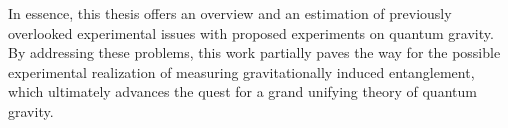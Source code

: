 In essence, this thesis offers an overview and an estimation of previously overlooked experimental issues with proposed experiments on quantum gravity.
By addressing these problems, this work partially paves the way for the possible experimental realization of measuring gravitationally induced entanglement, which ultimately advances the quest for a grand unifying theory of quantum gravity. 







